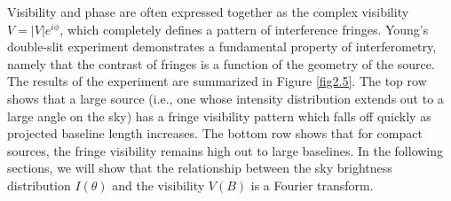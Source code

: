 Visibility and phase are often expressed together as the complex visibility $V=|V|e^{i\phi}$, which completely defines a pattern of interference fringes. Young's double-slit experiment demonstrates a fundamental property of interferometry, namely that the contrast of fringes is a function of the geometry of the source. The results of the experiment are summarized in Figure \ref{fig2.5}. The top row shows that a large source (i.e., one whose intensity distribution extends out to a large angle on the sky) has a fringe visibility pattern which falls off quickly as projected baseline length increases. The bottom row shows that for compact sources, the fringe visibility remains high out to large baselines. In the following sections, we will show that the relationship between the sky brightness distribution $I(\theta)$ and the visibility $V(B)$ is a Fourier transform.

